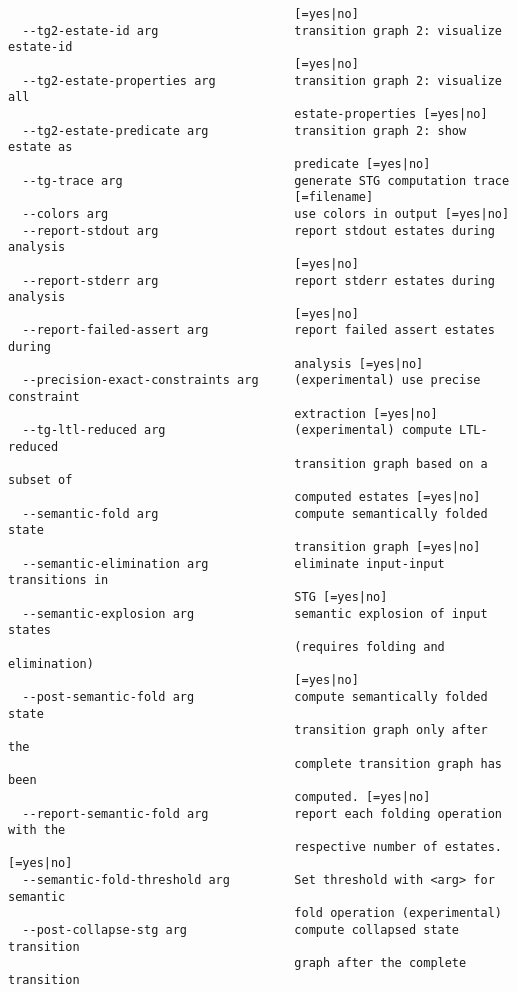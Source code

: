 \documentclass[natbib]{article}
\begin{document}
\begin{verbatim}
                                        [=yes|no]
  --tg2-estate-id arg                   transition graph 2: visualize estate-id
                                        [=yes|no]
  --tg2-estate-properties arg           transition graph 2: visualize all 
                                        estate-properties [=yes|no]
  --tg2-estate-predicate arg            transition graph 2: show estate as 
                                        predicate [=yes|no]
  --tg-trace arg                        generate STG computation trace 
                                        [=filename]
  --colors arg                          use colors in output [=yes|no]
  --report-stdout arg                   report stdout estates during analysis 
                                        [=yes|no]
  --report-stderr arg                   report stderr estates during analysis 
                                        [=yes|no]
  --report-failed-assert arg            report failed assert estates during 
                                        analysis [=yes|no]
  --precision-exact-constraints arg     (experimental) use precise constraint 
                                        extraction [=yes|no]
  --tg-ltl-reduced arg                  (experimental) compute LTL-reduced 
                                        transition graph based on a subset of 
                                        computed estates [=yes|no]
  --semantic-fold arg                   compute semantically folded state 
                                        transition graph [=yes|no]
  --semantic-elimination arg            eliminate input-input transitions in 
                                        STG [=yes|no]
  --semantic-explosion arg              semantic explosion of input states 
                                        (requires folding and elimination) 
                                        [=yes|no]
  --post-semantic-fold arg              compute semantically folded state 
                                        transition graph only after the 
                                        complete transition graph has been 
                                        computed. [=yes|no]
  --report-semantic-fold arg            report each folding operation with the 
                                        respective number of estates. [=yes|no]
  --semantic-fold-threshold arg         Set threshold with <arg> for semantic 
                                        fold operation (experimental)
  --post-collapse-stg arg               compute collapsed state transition 
                                        graph after the complete transition 

\end{verbatim}
\end{document}

